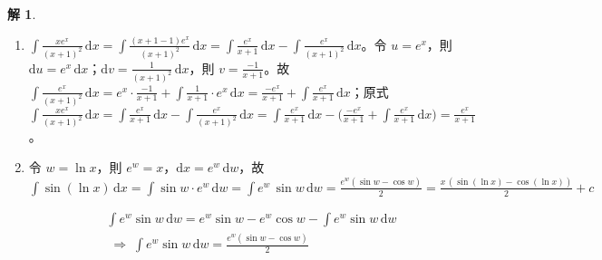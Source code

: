 \documentclass[12pt]{extarticle}
\newcommand{\ds}{\displaystyle}
\newcommand{\ie}{\;\Longrightarrow\;}
\theoremstyle{definition}
\newtheorem*{sol}{解}
\begin{document}
\begin{sol}
\begin{enumerate}
    \item $\ds\int\!\frac{x e^x}{(x + 1)^2}\,\text{d}x = \int\!\frac{(x + 1 - 1)e^x}{(x + 1)^2}\,\text{d}x = \int\!\frac{e^x}{x + 1}\,\text{d}x - \int\!\frac{e^x}{(x + 1)^2}\,\text{d}x$。令 $\ds u = e^x$，則 $\ds\text{d}u = e^x\,\text{d}x$；$\ds\text{d}v = \frac{1}{(x + 1)^2}\,\text{d}x$，則 $\ds v = \frac{-1}{x + 1}$。故 $\ds\int\!\frac{e^x}{(x + 1)^2}\,\mathrm{d}x = e^x\cdot\frac{-1}{x + 1} + \int\!\frac{1}{x + 1}\cdot e^x\,\text{d}x = \frac{-e^x}{x + 1} + \int\!\frac{e^x}{x + 1}\,\text{d}x$；原式 $\ds\int\!\frac{x e^x}{(x + 1)^2}\,\text{d}x = \int\!\frac{e^x}{x + 1}\,\text{d}x - \int\!\frac{e^x}{(x + 1)^2}\,\text{d}x = \int\!\frac{e^x}{x + 1}\,\text{d}x - \Big(\frac{-e^x}{x + 1} + \int\!\frac{e^x}{x + 1}\,\text{d}x\Big) = \frac{e^x}{x + 1}$。
    \item 令 $\ds w = \ln x$，則 $\ds e^w = x$，$\ds\text{d}x = e^w\,\text{d}w$，故 $\ds\int\!\sin(\ln x)\,\text{d}x = \int\!\sin w\cdot e^w\,\text{d}w = \int e^w\,\sin w\,\text{d}w = \frac{e^w(\sin w - \cos w)}{2} = \frac{x\,(\sin(\ln x) - \cos(\ln x))}{2} + c$ \\
      \begin{minipage}{0.15\textwidth}
      \end{minipage}
      \hspace{5mm}
      \begin{minipage}{0.8\textwidth}
        \begin{align*}
          &\int e^w\sin w\,\mathrm{d}w = e^{w}\sin w - e^w\cos w - \int e^w\sin w\,\mathrm{d}w\\ 
          &\ie\int e^w\sin w\,\mathrm{d}w = \frac{e^w(\sin w - \cos w)}{2}
        \end{align*}
      \end{minipage}

\end{enumerate}
\end{sol}
\end{document}
